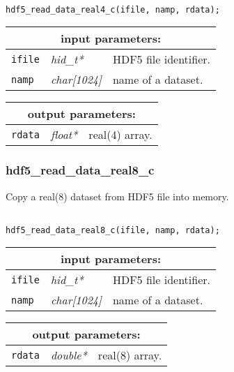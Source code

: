\begin{verbatim}

hdf5_read_data_real4_c(ifile, namp, rdata);
\end{verbatim}

\noindent
\begin{tabular}{|p{1.5cm}|p{2cm}|p{11cm}|}
\hline
\multicolumn{3}{|c|}{\bf input parameters:} \\
\hline
{\tt ifile} & {\it hid\_t*} & HDF5 file identifier. \\
\hline
{\tt namp} & {\it char[1024]} & name of a dataset. \\
\hline
\end{tabular}

\vskip 0.8cm

\noindent
\begin{tabular}{|p{1.5cm}|p{2cm}|p{11cm}|}
\hline
\multicolumn{3}{|c|}{\bf output parameters:} \\
\hline
{\tt rdata} & {\it float*} & real(4) array. \\
\hline
\end{tabular}

\subsubsection{hdf5\_read\_data\_real8\_c}

Copy a real(8) dataset from HDF5 file into memory.

\begin{verbatim}

hdf5_read_data_real8_c(ifile, namp, rdata);
\end{verbatim}

\noindent
\begin{tabular}{|p{1.5cm}|p{2cm}|p{11cm}|}
\hline
\multicolumn{3}{|c|}{\bf input parameters:} \\
\hline
{\tt ifile} & {\it hid\_t*} & HDF5 file identifier. \\
\hline
{\tt namp} & {\it char[1024]} & name of a dataset. \\
\hline
\end{tabular}

\vskip 0.8cm

\noindent
\begin{tabular}{|p{1.5cm}|p{2cm}|p{11cm}|}
\hline
\multicolumn{3}{|c|}{\bf output parameters:} \\
\hline
{\tt rdata} & {\it double*} & real(8) array. \\
\hline
\end{tabular}

